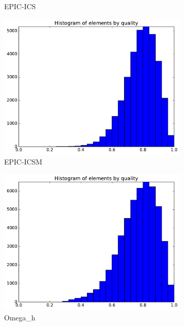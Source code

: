 \documentclass[3p,times,procedia,number]{elsarticle}
\begin{document}
\begin{figure}
\begin{subfigure}{.24\textwidth}
\caption{EPIC-ICS}
\end{subfigure}
\begin{subfigure}{.24\textwidth}
\centering
\includegraphics[width=\textwidth]{epic-icsm-cube-cylinder-polar-2-quality.pdf}
\caption{EPIC-ICSM}
\end{subfigure}
\begin{subfigure}{.24\textwidth}
\centering
\includegraphics[width=\textwidth]{omega_h-cube-cylinder-polar-2-quality.pdf}
\caption{Omega\_h}
\end{subfigure}
\begin{subfigure}{.24\textwidth}
\centering

\end{subfigure}
\end{figure}
\end{document}
